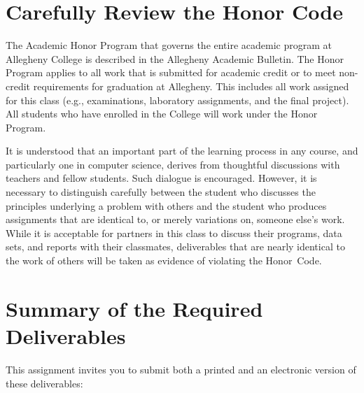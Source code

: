 \section*{Carefully Review the Honor Code}

The Academic Honor Program that governs the entire academic program at Allegheny College is described in the Allegheny
Academic Bulletin. The Honor Program applies to all work that is submitted for academic credit or to meet non-credit
requirements for graduation at Allegheny. This includes all work assigned for this class (e.g., examinations, laboratory
assignments, and the final project). All students who have enrolled in the College will work under the Honor Program.


\noindent It is understood that an important part of the learning process in any course, and particularly one in
computer science, derives from thoughtful discussions with teachers and fellow students.  Such dialogue is encouraged.
However, it is necessary to distinguish carefully between the student who discusses the principles underlying a problem
with others and the student who produces assignments that are identical to, or merely variations on, someone else's
work. While it is acceptable for partners in this class to discuss their programs, data sets, and reports with their
classmates, deliverables that are nearly identical to the work of others will be taken as evidence of violating the
\mbox{Honor Code}.

\section*{Summary of the Required Deliverables}

This assignment invites you to submit both a printed and an electronic version of these deliverables:

